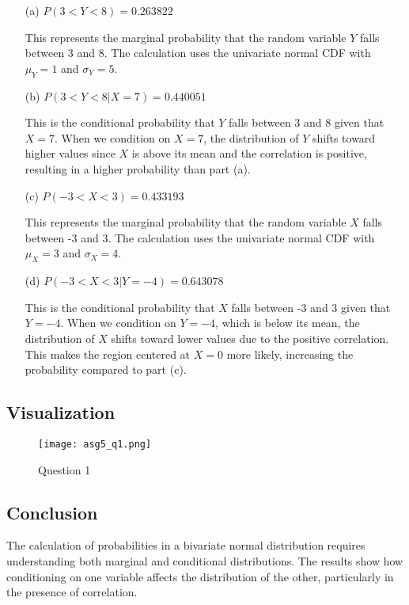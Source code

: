 \documentclass[12pt]{article}
\begin{document}
\begin{enumerate}
    \item[(a)] $P(3 < Y < 8) = 0.263822$
    
    This represents the marginal probability that the random variable $Y$ falls between 3 and 8. The calculation uses the univariate normal CDF with $\mu_Y = 1$ and $\sigma_Y = 5$.
    
    \item[(b)] $P(3 < Y < 8 | X = 7) = 0.440051$
    
    This is the conditional probability that $Y$ falls between 3 and 8 given that $X = 7$. When we condition on $X = 7$, the distribution of $Y$ shifts toward higher values since $X$ is above its mean and the correlation is positive, resulting in a higher probability than part (a).
    
    \item[(c)] $P(-3 < X < 3) = 0.433193$
    
    This represents the marginal probability that the random variable $X$ falls between -3 and 3. The calculation uses the univariate normal CDF with $\mu_X = 3$ and $\sigma_X = 4$.
    
    \item[(d)] $P(-3 < X < 3 | Y = -4) = 0.643078$
    
    This is the conditional probability that $X$ falls between -3 and 3 given that $Y = -4$. When we condition on $Y = -4$, which is below its mean, the distribution of $X$ shifts toward lower values due to the positive correlation. This makes the region centered at $X = 0$ more likely, increasing the probability compared to part (c).
\end{enumerate}

\subsection{Visualization}
\begin{figure}[H]
    \centering
    \texttt{[image: asg5\_q1.png]}
    \caption{Question 1}
    \label{fig:enter-label}
\end{figure}

\subsection{Conclusion}

The calculation of probabilities in a bivariate normal distribution requires understanding both marginal and conditional distributions. The results show how conditioning on one variable affects the distribution of the other, particularly in the presence of correlation.
\end{document}
